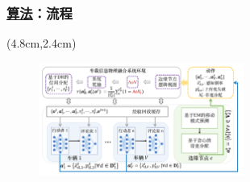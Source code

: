 \begin{frame}
\frametitle{\englishfont \underline{算法}：流程}
\newBackground

\begin{center}
\begin{textblock*}{\textwidth}(4.8cm,2.4cm)
\begin{figure}
\includegraphics[width=0.6\textwidth]{fig/Fig2-4-solution-model.pdf}
\end{figure}
\end{textblock*}
\end{center}


\end{frame}
